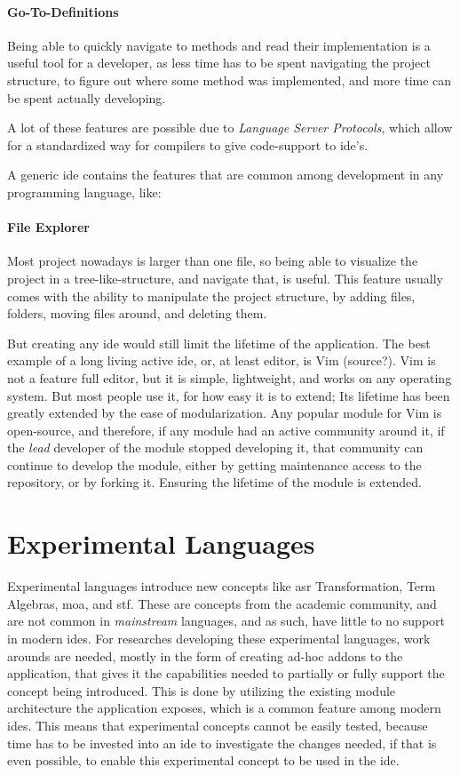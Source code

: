 \paragraph{Go-To-Definitions} Being able to quickly navigate to methods and read
their implementation is a useful tool for a developer, as less time has to be
spent navigating the project structure, to figure out where some method was
implemented, and more time can be spent actually developing.

A lot of these features are possible due to \textit{Language Server Protocols},
which allow for a standardized way for compilers to give code-support to
\gls{ide}'s.

A generic \gls{ide} contains the features that are common among development in
any programming language, like:

\paragraph{File Explorer} Most project nowadays is larger than one file, so
being able to visualize the project in a tree-like-structure, and navigate that,
is useful. This feature usually comes with the ability to manipulate the project
structure, by adding files, folders, moving files around, and deleting them.

But creating any \gls{ide} would still limit the lifetime of the application. The best
example of a long living active \gls{ide}, or, at least editor, is Vim (source?). Vim
is not a feature full editor, but it is simple, lightweight, and works on any
operating system. But most people use it, for how easy it is to extend; Its
lifetime has been greatly extended by the ease of modularization. Any popular
module for Vim is open-source, and therefore, if any module had an active
community around it, if the \textit{lead} developer of the module stopped
developing it, that community can continue to develop the module, either by
getting maintenance access to the repository, or by forking it. Ensuring the
lifetime of the module is extended.

\section{Experimental Languages}

Experimental languages introduce new concepts like \gls{asr} Transformation,
Term Algebras, \gls{moa}, and \gls{stf}. These are concepts from the
academic community, and are not common in \textit{mainstream} languages, and
as such, have little to no support in modern \gls{ide}s. For researches
developing these experimental languages, work arounds are needed, mostly in the
form of creating ad-hoc addons to the application, that gives it the capabilities
needed to partially or fully support the concept being introduced. This is done
by utilizing the existing module architecture the application exposes, which is
a common feature among modern \gls{ide}s. This means that experimental concepts
cannot be easily tested, because time has to be invested into an \gls{ide} to
investigate the changes needed, if that is even possible, to enable this
experimental concept to be used in the \gls{ide}.

